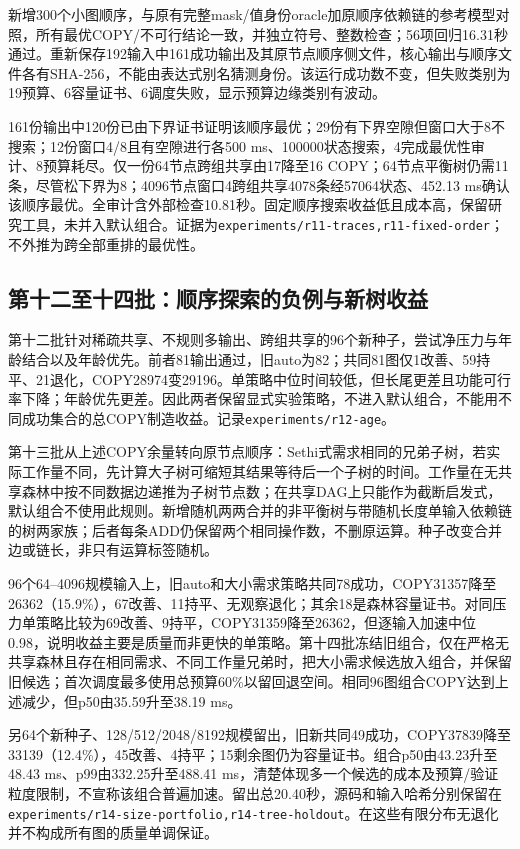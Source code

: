 \documentclass[UTF8,11pt,fontset=fandol]{ctexart}
\begin{document}
新增300个小图顺序，与原有完整mask/值身份oracle加原顺序依赖链的参考模型对照，所有最优COPY/不可行结论一致，并独立符号、整数检查；56项回归16.31秒通过。重新保存192输入中161成功输出及其原节点顺序侧文件，核心输出与顺序文件各有SHA-256，不能由表达式别名猜测身份。该运行成功数不变，但失败类别为19预算、6容量证书、6调度失败，显示预算边缘类别有波动。

161份输出中120份已由下界证书证明该顺序最优；29份有下界空隙但窗口大于8不搜索；12份窗口4/8且有空隙进行各500 ms、100000状态搜索，4完成最优性审计、8预算耗尽。仅一份64节点跨组共享由17降至16 COPY；64节点平衡树仍需11条，尽管松下界为8；4096节点窗口4跨组共享4078条经57064状态、452.13 ms确认该顺序最优。全审计含外部检查10.81秒。固定顺序搜索收益低且成本高，保留研究工具，未并入默认组合。证据为\texttt{experiments/r11-traces,r11-fixed-order}；不外推为跨全部重排的最优性。

\subsection{第十二至十四批：顺序探索的负例与新树收益}
第十二批针对稀疏共享、不规则多输出、跨组共享的96个新种子，尝试净压力与年龄结合以及年龄优先。前者81输出通过，旧auto为82；共同81图仅1改善、59持平、21退化，COPY28974变29196。单策略中位时间较低，但长尾更差且功能可行率下降；年龄优先更差。因此两者保留显式实验策略，不进入默认组合，不能用不同成功集合的总COPY制造收益。记录\texttt{experiments/r12-age}。

第十三批从上述COPY余量转向原节点顺序：Sethi式需求相同的兄弟子树，若实际工作量不同，先计算大子树可缩短其结果等待后一个子树的时间。工作量在无共享森林中按不同数据边递推为子树节点数；在共享DAG上只能作为截断启发式，默认组合不使用此规则。新增随机两两合并的非平衡树与带随机长度单输入依赖链的树两家族；后者每条ADD仍保留两个相同操作数，不删原运算。种子改变合并边或链长，非只有运算标签随机。

96个64--4096规模输入上，旧auto和大小需求策略共同78成功，COPY31357降至26362（15.9\%），67改善、11持平、无观察退化；其余18是森林容量证书。对同压力单策略比较为69改善、9持平，COPY31359降至26362，但逐输入加速中位0.98，说明收益主要是质量而非更快的单策略。第十四批冻结旧组合，仅在严格无共享森林且存在相同需求、不同工作量兄弟时，把大小需求候选放入组合，并保留旧候选；首次调度最多使用总预算60\%以留回退空间。相同96图组合COPY达到上述减少，但p50由35.59升至38.19 ms。

另64个新种子、128/512/2048/8192规模留出，旧新共同49成功，COPY37839降至33139（12.4\%），45改善、4持平；15剩余图仍为容量证书。组合p50由43.23升至48.43 ms、p99由332.25升至488.41 ms，清楚体现多一个候选的成本及预算/验证粒度限制，不宣称该组合普遍加速。留出总20.40秒，源码和输入哈希分别保留在\texttt{experiments/r14-size-portfolio,r14-tree-holdout}。在这些有限分布无退化并不构成所有图的质量单调保证。
\end{document}
